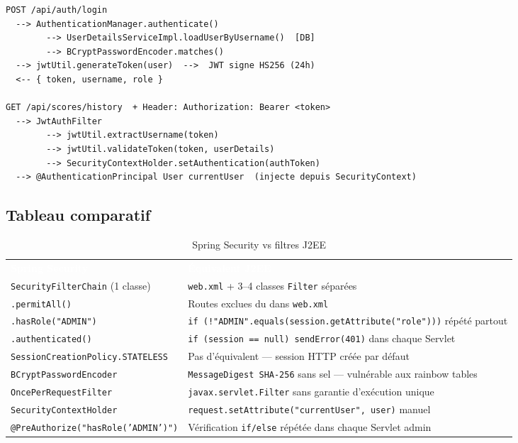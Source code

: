\documentclass[11pt,a4paper]{article}
\newcommand{\code}[1]{\texttt{\small #1}}
\newcommand{\theadrow}[2]{%
  \rowcolor{headerbg}\textcolor{white}{\textbf{#1}} & \textcolor{white}{\textbf{#2}}\\}
\begin{document}
\begin{lstlisting}[language={}]
POST /api/auth/login
  --> AuthenticationManager.authenticate()
        --> UserDetailsServiceImpl.loadUserByUsername()  [DB]
        --> BCryptPasswordEncoder.matches()
  --> jwtUtil.generateToken(user)  -->  JWT signe HS256 (24h)
  <-- { token, username, role }

GET /api/scores/history  + Header: Authorization: Bearer <token>
  --> JwtAuthFilter
        --> jwtUtil.extractUsername(token)
        --> jwtUtil.validateToken(token, userDetails)
        --> SecurityContextHolder.setAuthentication(authToken)
  --> @AuthenticationPrincipal User currentUser  (injecte depuis SecurityContext)
\end{lstlisting}

\subsection{Tableau comparatif}

\begin{table}[h!]
\centering
\renewcommand{\arraystretch}{1.35}
\begin{tabularx}{\linewidth}{L{5cm} X}
\theadrow{Spring Security}{Équivalent J2EE}
\code{SecurityFilterChain} (1 classe) & \code{web.xml} + 3--4 classes \code{Filter} séparées \\
\code{.permitAll()}                    & Routes exclues du \code{<url-pattern>} dans \code{web.xml} \\
\code{.hasRole("ADMIN")}               & \code{if (!"ADMIN".equals(session.getAttribute("role")))} répété partout \\
\code{.authenticated()}                & \code{if (session == null) sendError(401)} dans chaque Servlet \\
\code{SessionCreationPolicy.STATELESS} & Pas d'équivalent — session HTTP créée par défaut \\
\code{BCryptPasswordEncoder}           & \code{MessageDigest SHA-256} sans sel — vulnérable aux rainbow tables \\
\code{OncePerRequestFilter}            & \code{javax.servlet.Filter} sans garantie d'exécution unique \\
\code{SecurityContextHolder}           & \code{request.setAttribute("currentUser", user)} manuel \\
\code{@PreAuthorize("hasRole('ADMIN')")} & Vérification \code{if/else} répétée dans chaque Servlet admin \\
\bottomrule
\end{tabularx}
\caption{Spring Security vs filtres J2EE}
\end{table}
\end{document}

